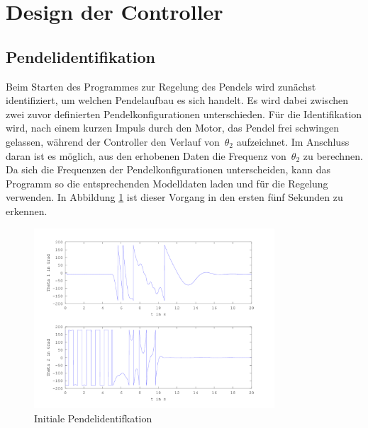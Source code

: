 \section{Design der Controller}
\label{sec.Controller}
\subsection{Pendelidentifikation}
\label{Pendelidentifikation}
Beim Starten des Programmes zur Regelung des Pendels wird zunächst identifiziert, um welchen Pendelaufbau es sich handelt. Es wird dabei zwischen zwei zuvor definierten Pendelkonfigurationen unterschieden.
Für die Identifikation wird, nach einem kurzen Impuls durch den Motor, das Pendel frei schwingen gelassen, während der Controller den Verlauf von~$\theta_2$ aufzeichnet. Im Anschluss daran ist es möglich, aus den erhobenen Daten die Frequenz von~$\theta_2$ zu berechnen. Da sich die Frequenzen der Pendelkonfigurationen unterscheiden, kann das Programm so die entsprechenden Modelldaten laden und für die Regelung verwenden. In Abbildung \ref{fig.Identifikation} ist dieser Vorgang in den ersten fünf Sekunden zu erkennen.

\begin{figure}[htbp]
	\centering	
	\includegraphics[width=0.8\textwidth]{Grafiken/Swingup_kurz.png}
	\caption{Initiale Pendelidentifkation}
	\label{fig.Identifikation}
\end{figure}



